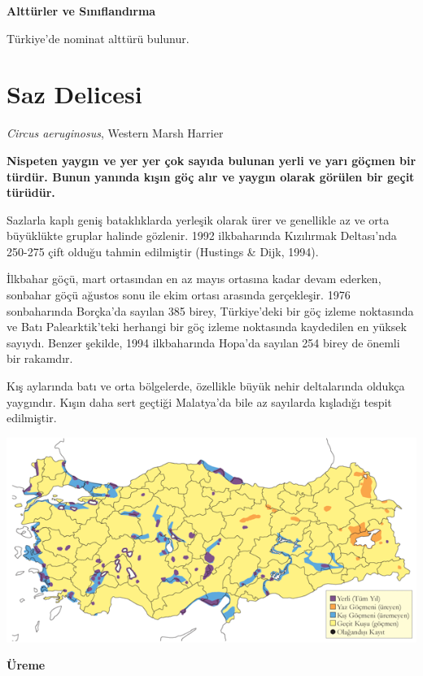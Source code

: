 \documentclass[
  a4paper,
  DIV=11,
  numbers=noendperiod]{scrreprt}
\begin{document}
\textbf{Alttürler ve Sınıflandırma}

Türkiye'de nominat alttürü bulunur.

\section{Saz Delicesi}\label{saz-delicesi}

\emph{Circus aeruginosus}, Western Marsh Harrier

\textbf{Nispeten yaygın ve yer yer çok sayıda bulunan yerli ve yarı
göçmen bir türdür. Bunun yanında kışın göç alır ve yaygın olarak görülen
bir geçit türüdür.}

Sazlarla kaplı geniş bataklıklarda yerleşik olarak ürer ve genellikle az
ve orta büyüklükte gruplar halinde gözlenir. 1992 ilkbaharında
Kızılırmak Deltası'nda 250-275 çift olduğu tahmin edilmiştir (Hustings
\& Dijk, 1994).

İlkbahar göçü, mart ortasından en az mayıs ortasına kadar devam ederken,
sonbahar göçü ağustos sonu ile ekim ortası arasında gerçekleşir. 1976
sonbaharında Borçka'da sayılan 385 birey, Türkiye'deki bir göç izleme
noktasında ve Batı Palearktik'teki herhangi bir göç izleme noktasında
kaydedilen en yüksek sayıydı. Benzer şekilde, 1994 ilkbaharında Hopa'da
sayılan 254 birey de önemli bir rakamdır.

Kış aylarında batı ve orta bölgelerde, özellikle büyük nehir
deltalarında oldukça yaygındır. Kışın daha sert geçtiği Malatya'da bile
az sayılarda kışladığı tespit edilmiştir.

\includegraphics{images/harita_Page_102.png}

\textbf{Üreme}
\end{document}
